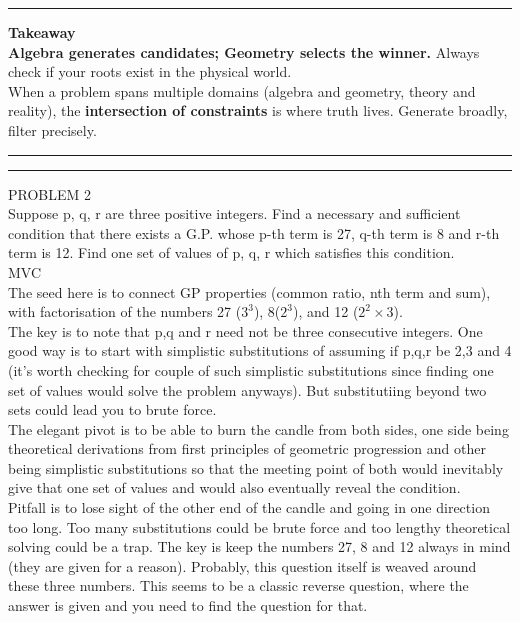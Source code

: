 \documentclass{article}
\begin{document}
\noindent \rule{\textwidth}{0.4pt}

\noindent \textbf{Takeaway} \\

\noindent \textbf{Algebra generates candidates; Geometry selects the winner.} Always check if your roots exist in the physical world. \\

\noindent When a problem spans multiple domains (algebra and geometry, theory and reality), the \textbf{intersection of constraints} is where truth lives. Generate broadly, filter precisely. \\

\noindent \rule{\textwidth}{0.4pt}
\noindent \rule{\textwidth}{0.4pt}

\noindent PROBLEM 2 \\

\noindent Suppose p, q, r are three positive integers. Find a necessary and sufficient condition that there exists a G.P. whose p-th term is 27, q-th term is 8 and r-th term is 12. Find one set of values of p, q, r which satisfies this condition. \\

\noindent MVC \\
\noindent The seed here is to connect GP properties (common ratio, nth term and sum), with factorisation of the numbers 27 ($3^3$), 8($2^3$), and 12 ($2^2 \times 3$). \\

\noindent The key is to note that p,q and r need not be three consecutive integers. One good way is to start with simplistic substitutions of assuming if p,q,r be 2,3 and 4 (it's worth checking for couple of such simplistic substitutions since finding one set of values would solve the problem anyways). But substitutiing beyond two sets could lead you to brute force. \\

\noindent The elegant pivot is to be able to burn the candle from both sides, one side being theoretical derivations from first principles of geometric progression and other being simplistic substitutions so that the meeting point of both would inevitably give that one set of values and would also eventually reveal the condition. \\

\noindent Pitfall is to lose sight of the other end of the candle and going in one direction too long. Too many substitutions could be brute force and too lengthy theoretical solving could be a trap. The key is keep the numbers 27, 8 and 12 always in mind (they are given for a reason). Probably, this question itself is weaved around these three numbers. This seems to be a classic reverse question, where the answer is given and you need to find the question for that. \\
\end{document}
